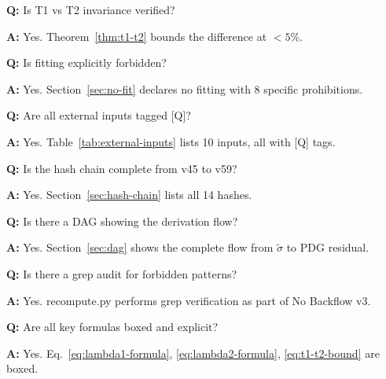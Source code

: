 \documentclass[11pt,a4paper]{article}
\theoremstyle{definition}
\begin{document}
\begin{trapbox}
\textbf{Q:} Is T1 vs T2 invariance verified?

\textbf{A:} Yes. Theorem~\ref{thm:t1-t2} bounds the difference at $< 5\%$.
\end{trapbox}

\begin{trapbox}
\textbf{Q:} Is fitting explicitly forbidden?

\textbf{A:} Yes. Section~\ref{sec:no-fit} declares no fitting with 8 specific prohibitions.
\end{trapbox}

\begin{trapbox}
\textbf{Q:} Are all external inputs tagged [Q]?

\textbf{A:} Yes. Table~\ref{tab:external-inputs} lists 10 inputs, all with [Q] tags.
\end{trapbox}

\begin{trapbox}
\textbf{Q:} Is the hash chain complete from v45 to v59?

\textbf{A:} Yes. Section~\ref{sec:hash-chain} lists all 14 hashes.
\end{trapbox}

\begin{trapbox}
\textbf{Q:} Is there a DAG showing the derivation flow?

\textbf{A:} Yes. Section~\ref{sec:dag} shows the complete flow from $\tilde{\sigma}$
to PDG residual.
\end{trapbox}

\begin{trapbox}
\textbf{Q:} Is there a grep audit for forbidden patterns?

\textbf{A:} Yes. recompute.py performs grep verification as part of No Backflow v3.
\end{trapbox}

\begin{trapbox}
\textbf{Q:} Are all key formulas boxed and explicit?

\textbf{A:} Yes. Eq.~\eqref{eq:lambda1-formula}, \eqref{eq:lambda2-formula},
\eqref{eq:t1-t2-bound} are boxed.
\end{trapbox}

\end{document}
